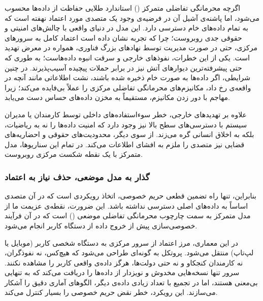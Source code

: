 اگرچه محرمانگی تفاضلی متمرکز () استاندارد طلایی حفاظت از داده‌ها محسوب می‌شود، اما پاشنه‌ی آشیل آن در فرضیه‌ی وجود یک متصدی مورد اعتماد نهفته است که به تمام داده‌های خام دسترسی دارد. این مدل در دنیای واقعی با چالش‌های امنیتی و حقوقی جدی روبروست؛ چرا که تجربه نشان داده است اعتماد کامل به سرورهای مرکزی، حتی در صورت مدیریت توسط نهادهای بزرگ فناوری، همواره در معرض تهدید است. یکی از این خطرات، نفوذهای خارجی و سرقت انبوه داده‌هاست؛ به طوری که حتی پیشرفته‌ترین دیوارهای آتش نیز در برابر حملات پیچیده آسیب‌پذیرند. در چنین شرایطی، اگر داده‌ها به صورت خام ذخیره شده باشند، نشت اطلاعاتی مانند آنچه در واقعه‌ی  رخ داد، مکانیزم‌های محرمانگی تفاضلی مرکزی را عملاً بی‌فایده می‌کند؛ زیرا مهاجم با دور زدن مکانیزم، مستقیماً به مخزن داده‌های حساس دست می‌یابد\cite{house2018equifax}. 

علاوه بر تهدیدهای خارجی، خطر سوءاستفاده‌های داخلی توسط کارمندان یا مدیران سیستم با دسترسی‌های سطح بالا نیز وجود دارد که امنیت داده‌ها را نه به ریاضیات، بلکه به اخلاق انسانی گره می‌زند. از سوی دیگر، محدودیت‌های حقوقی و احضاریه‌های قضایی نیز متصدی را ملزم به افشای اطلاعات می‌کند. در تمام این سناریوها، مدل متمرکز با یک نقطه شکست مرکزی روبروست. 

\subsubsection{گذار به مدل موضعی، حذف نیاز به اعتماد}

بنابراین، تنها راه تضمین قطعی حریم خصوصی، اتخاذ رویکردی است که در آن متصدی اساساً به داده‌های اصلی دسترسی نداشته باشد. این ضرورت، نقطه‌ی عزیمت ما از مدل متمرکز به سمت چارچوب محرمانگی تفاضلی موضعی () است که در آن فرآیند خصوصی‌سازی پیش از خروج داده از دستگاه کاربر انجام می‌شود.

در این معماری، مرز اعتماد از سرور مرکزی به دستگاه شخصی کاربر (موبایل یا لپ‌تاپ) منتقل می‌شود. پروتکل به گونه‌ای طراحی می‌شود که هیچ‌کس، نه نفوذگران، نه کارمندان کنجکاو و نه حتی دولت‌ها، هرگز داده‌ی واقعی کاربر را مشاهده نکنند. سرور تنها نسخه‌هایی مخدوش و نویزدار از داده‌ها را دریافت می‌کند که به تنهایی بی‌معنی هستند، اما در تجمیع با تعداد زیادی داده‌ی دیگر، الگوهای آماری دقیق را آشکار می‌سازند. این رویکرد، خطر نقض حریم خصوصی را بسیار کنترل می‌کند.

